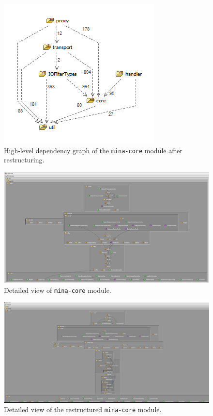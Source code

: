 \begin{figure}[H]
    \centering
    \includegraphics{images/MINA_core_dependencies_restructure.png}
    \caption{High-level dependency graph of the \texttt{mina-core} module after restructuring.}
    \label{fig:mina_core_dependencies_restructured}
\end{figure}

\begin{landscape}
\begin{figure}
    \centering
    \includegraphics[width=\linewidth]{images/MINA_core_extended_initial.png}
    \caption{Detailed view of \texttt{mina-core} module.}
    \label{fig:mina_core_initial_detailed}
\end{figure}
\end{landscape}

\begin{landscape}
\begin{figure}
    \centering
    \includegraphics[scale=0.4]{images/MINA_core_extended_restructured.png}
    \caption{Detailed view of the restructured \texttt{mina-core} module.}
    \label{fig:mina_core_restructured_detailed}
\end{figure}
\end{landscape}

